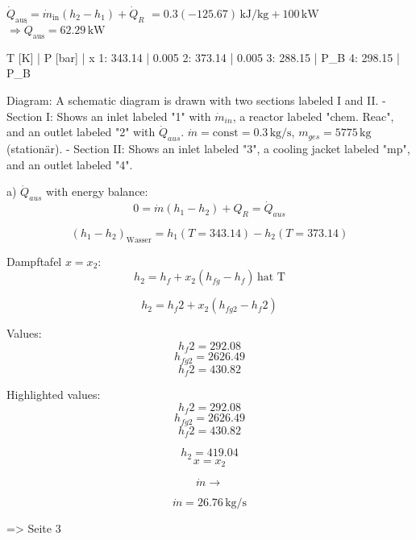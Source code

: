 \( \dot{Q}_{\text{aus}} = \dot{m}_{\text{in}} (h_2 - h_1) + \dot{Q}_R \)  
\( = 0.3 (-125.67) \, \text{kJ/kg} + 100 \, \text{kW} \)  
\( \Rightarrow \dot{Q}_{\text{aus}} = 62.29 \, \text{kW} \)

T [K] | P [bar] | x  
1: 343.14 | 0.005  
2: 373.14 | 0.005  
3: 288.15 | P_B  
4: 298.15 | P_B  

Diagram:  
A schematic diagram is drawn with two sections labeled I and II.  
- Section I: Shows an inlet labeled "1" with \( \dot{m}_{in} \), a reactor labeled "chem. Reac", and an outlet labeled "2" with \( \dot{Q}_{aus} \).  
  \( \dot{m} = \text{const} = 0.3 \, \text{kg/s} \), \( m_{ges} = 5775 \, \text{kg} \) (stationär).  
- Section II: Shows an inlet labeled "3", a cooling jacket labeled "mp", and an outlet labeled "4".  

a) \( \dot{Q}_{aus} \) with energy balance:  
\[ 0 = \dot{m} (h_1 - h_2) + Q_R = \dot{Q}_{aus} \]  

\[ (h_1 - h_2)_{\text{Wasser}} = h_1 (T = 343.14) - h_2 (T = 373.14) \]  

Dampftafel \( x = x_2 \):  
\[ h_2 = h_f + x_2 (h_{fg} - h_f) \, \text{hat T} \]  

\[ h_2 = h_f2 + x_2 (h_{fg2} - h_f2) \]  

Values:  
\[ h_f2 = 292.08 \]  
\[ h_{fg2} = 2626.49 \]  
\[ h_f2 = 430.82 \]  

Highlighted values:  
\[ h_f2 = 292.08 \]  
\[ h_{fg2} = 2626.49 \]  
\[ h_f2 = 430.82 \]  

\[ h_2 = 419.04 \]  
\[ x = x_2 \]  

\[ \dot{m} \rightarrow \]  

\[ \dot{m} = 26.76 \, \text{kg/s} \]  

=> Seite 3